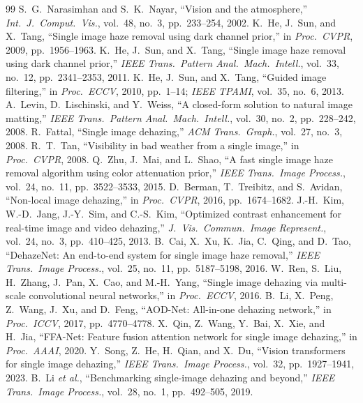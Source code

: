\documentclass[conference]{IEEEtran}
\begin{document}
\begin{thebibliography}{99}
 S.~G.~Narasimhan and S.~K.~Nayar, ``Vision and the atmosphere,'' \emph{Int.\ J.\ Comput.\ Vis.}, vol.~48, no.~3, pp.~233--254, 2002.
 K.~He, J.~Sun, and X.~Tang, ``Single image haze removal using dark channel prior,'' in \emph{Proc.\ CVPR}, 2009, pp.~1956--1963.
 K.~He, J.~Sun, and X.~Tang, ``Single image haze removal using dark channel prior,'' \emph{IEEE Trans.\ Pattern Anal.\ Mach.\ Intell.}, vol.~33, no.~12, pp.~2341--2353, 2011.
 K.~He, J.~Sun, and X.~Tang, ``Guided image filtering,'' in \emph{Proc.\ ECCV}, 2010, pp.~1--14; \emph{IEEE TPAMI}, vol.~35, no.~6, 2013.
 A.~Levin, D.~Lischinski, and Y.~Weiss, ``A closed-form solution to natural image matting,'' \emph{IEEE Trans.\ Pattern Anal.\ Mach.\ Intell.}, vol.~30, no.~2, pp.~228--242, 2008.
 R.~Fattal, ``Single image dehazing,'' \emph{ACM Trans.\ Graph.}, vol.~27, no.~3, 2008.
 R.~T.~Tan, ``Visibility in bad weather from a single image,'' in \emph{Proc.\ CVPR}, 2008.
 Q.~Zhu, J.~Mai, and L.~Shao, ``A fast single image haze removal algorithm using color attenuation prior,'' \emph{IEEE Trans.\ Image Process.}, vol.~24, no.~11, pp.~3522--3533, 2015.
 D.~Berman, T.~Treibitz, and S.~Avidan, ``Non-local image dehazing,'' in \emph{Proc.\ CVPR}, 2016, pp.~1674--1682.
 J.-H.~Kim, W.-D.~Jang, J.-Y.~Sim, and C.-S.~Kim, ``Optimized contrast enhancement for real-time image and video dehazing,'' \emph{J.\ Vis.\ Commun.\ Image Represent.}, vol.~24, no.~3, pp.~410--425, 2013.
 B.~Cai, X.~Xu, K.~Jia, C.~Qing, and D.~Tao, ``DehazeNet: An end-to-end system for single image haze removal,'' \emph{IEEE Trans.\ Image Process.}, vol.~25, no.~11, pp.~5187--5198, 2016.
 W.~Ren, S.~Liu, H.~Zhang, J.~Pan, X.~Cao, and M.-H.~Yang, ``Single image dehazing via multi-scale convolutional neural networks,'' in \emph{Proc.\ ECCV}, 2016.
 B.~Li, X.~Peng, Z.~Wang, J.~Xu, and D.~Feng, ``AOD-Net: All-in-one dehazing network,'' in \emph{Proc.\ ICCV}, 2017, pp.~4770--4778.
 X.~Qin, Z.~Wang, Y.~Bai, X.~Xie, and H.~Jia, ``FFA-Net: Feature fusion attention network for single image dehazing,'' in \emph{Proc.\ AAAI}, 2020.
 Y.~Song, Z.~He, H.~Qian, and X.~Du, ``Vision transformers for single image dehazing,'' \emph{IEEE Trans.\ Image Process.}, vol.~32, pp.~1927--1941, 2023.
 B.~Li \emph{et al.}, ``Benchmarking single-image dehazing and beyond,'' \emph{IEEE Trans.\ Image Process.}, vol.~28, no.~1, pp.~492--505, 2019.

\end{thebibliography}
\end{document}
